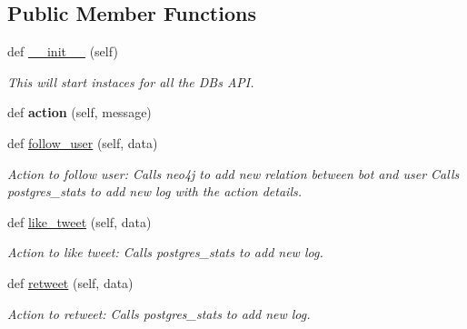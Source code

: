 \subsection*{Public Member Functions}
\begin{DoxyCompactItemize}
\item 
\mbox{\label{classtwitter_1_1control__center_1_1dbwriter_1_1DBWriter_a084c7286de1162ebb245a955a65e3911}} 
def \hyperlink{classtwitter_1_1control__center_1_1dbwriter_1_1DBWriter_a084c7286de1162ebb245a955a65e3911}{\+\_\+\+\_\+init\+\_\+\+\_\+} (self)
\begin{DoxyCompactList}\small\item\em This will start instaces for all the DB\textquotesingle{}s A\+PI. \end{DoxyCompactList}\item 
\mbox{\label{classtwitter_1_1control__center_1_1dbwriter_1_1DBWriter_a87d9173e78b04aa21fac689879b5a3b3}} 
def {\bfseries action} (self, message)
\item 
def \hyperlink{classtwitter_1_1control__center_1_1dbwriter_1_1DBWriter_a59e9de0b9462c07bc173e160c3431e5a}{follow\+\_\+user} (self, data)
\begin{DoxyCompactList}\small\item\em Action to follow user\+: Calls neo4j to add new relation between bot and user Calls postgres\+\_\+stats to add new log with the action details. \end{DoxyCompactList}\item 
def \hyperlink{classtwitter_1_1control__center_1_1dbwriter_1_1DBWriter_a4539c991b82dd529602cbd13d21a89b4}{like\+\_\+tweet} (self, data)
\begin{DoxyCompactList}\small\item\em Action to like tweet\+: Calls postgres\+\_\+stats to add new log. \end{DoxyCompactList}\item 
def \hyperlink{classtwitter_1_1control__center_1_1dbwriter_1_1DBWriter_a840d1892b618a29a5e44305cb6aa0211}{retweet} (self, data)
\begin{DoxyCompactList}\small\item\em Action to retweet\+: Calls postgres\+\_\+stats to add new log. \end{DoxyCompactList}\item 

\end{DoxyCompactItemize}
